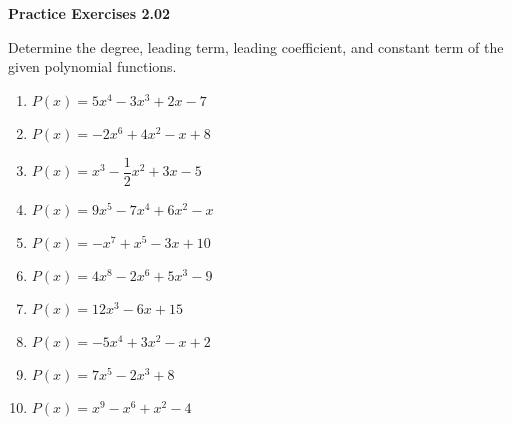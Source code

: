 \vspace{0.3ex}
\noindent\textbf{Practice Exercises 2.02}

\vspace{0.2ex}

Determine the degree, leading term, leading coefficient, and constant term of the given polynomial functions.
\begin{multicols}{2}
\begin{enumerate}
    \item \( P(x) = 5x^4 - 3x^3 + 2x - 7 \)
    \item \( P(x) = -2x^6 + 4x^2 - x + 8 \)
    \item \( P(x) = x^3 - \dfrac{1}{2}x^2 + 3x - 5 \)
    \item \( P(x) = 9x^5 - 7x^4 + 6x^2 - x \)
    \item \( P(x) = -x^7 + x^5 - 3x + 10 \)
    \item \( P(x) = 4x^8 - 2x^6 + 5x^3 - 9 \)
    \item \( P(x) = 12x^3 - 6x + 15 \)
    \item \( P(x) = -5x^4 + 3x^2 - x + 2 \)
    \item \( P(x) = 7x^5 - 2x^3 + 8 \)
    \item \( P(x) = x^9 - x^6 + x^2 - 4 \)
\end{enumerate}
\end{multicols}
